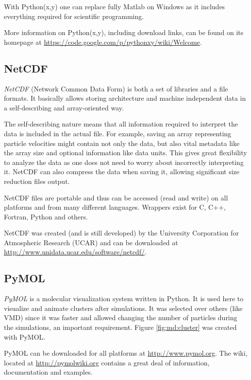 With Python(x,y) one can replace fully Matlab on Windows as it includes
everything required for scientific programming.

More information on Python(x,y), including download links, can be found on its
homepage at
\url{https://code.google.com/p/pythonxy/wiki/Welcome}.


\subsection*{NetCDF}

\textit{NetCDF} (Network Common Data Form) is both a set of libraries and a file
formats. It basically allows storing architecture and machine independent data
in a self-describing and array-oriented way.

The self-describing nature means that all information required to interpret the
data is included in the actual file. For example, saving an array representing
particle velocities might contain not only the data, but also vital metadata
like the array size and optional information like data units. This gives
great flexibility to analyze the data as one does not need to worry about
incorrectly interpreting it. NetCDF can also compress the data when saving it,
allowing significant size reduction files output.

NetCDF files are portable and thus can be accessed (read and write) on all
platforms and from many different languages. Wrappers exist for C, C++, Fortran,
Python and others.

NetCDF was created (and is still developed) by the University Corporation for
Atmospheric Research (UCAR) and can be downloaded at \\
\url{http://www.unidata.ucar.edu/software/netcdf/}.


\subsection*{PyMOL}

\textit{PyMOL} is a molecular visualization system written in Python.
It is used here to visualize and animate clusters after simulations. It was
selected over others (like VMD) since it was faster and allowed changing the
number of particles during the simulations, an important requirement.
Figure \ref{fig:md:cluster} was created with PyMOL.

PyMOL can be downloaded for all platforms at \url{http://www.pymol.org}. The
wiki, located at \url{http://pymolwiki.org} contains a great deal of information,
documentation and examples.


